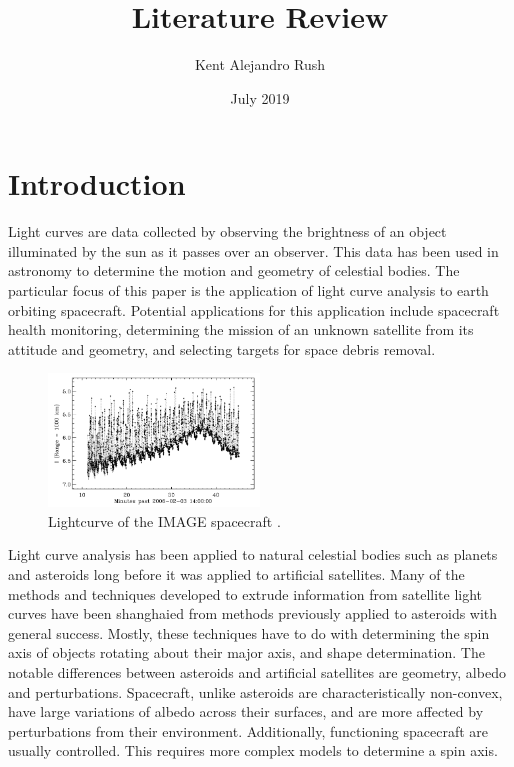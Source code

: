 \documentclass{article}
\title{Literature Review}
\author{Kent Alejandro Rush }
\date{July 2019}
\begin{document}
\maketitle

\section{Introduction}

Light curves are data collected by observing the brightness of an object illuminated by the sun as it passes over an observer. This data has been used in astronomy to determine the motion and geometry of celestial bodies. The particular focus of this paper is the application of light curve analysis to earth orbiting spacecraft. Potential applications for this application include spacecraft health monitoring, determining the mission of an unknown satellite from its attitude and geometry, and selecting targets for space debris removal.

\begin{figure}[h]
	\centering
	\includegraphics[width=0.5\textwidth]{lightcurve_AMOS}
	\caption{Lightcurve of the IMAGE spacecraft \cite{AMOS}.}
\end{figure}

Light curve analysis has been applied to natural celestial bodies such as planets and asteroids long before it was applied to artificial satellites. Many of the methods and techniques developed to extrude information from satellite light curves have been shanghaied from methods previously applied to asteroids with general success. Mostly, these techniques have to do with determining the spin axis of objects rotating about their major axis, and shape determination. The notable differences between asteroids and artificial satellites are geometry, albedo and perturbations. Spacecraft, unlike asteroids are characteristically non-convex, have large variations of albedo across their surfaces, and are more affected by perturbations from their environment. Additionally, functioning spacecraft are usually controlled. This requires more complex models to determine a spin axis.
\end{document}
